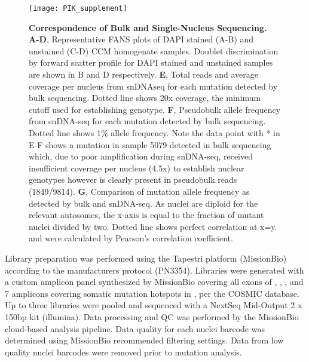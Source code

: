 \begin{figure}[tbp!]
\begin{center}
\texttt{[image: PIK\_supplement]}
\end{center}
\caption[Correspondence of Bulk and Single-Nucleus Sequencing.] {\textbf{Correspondence of Bulk and Single-Nucleus Sequencing.} \\ \textbf{A-D}, Representative FANS plots of DAPI stained (A-B) and unstained (C-D) CCM homogenate samples. Doublet discrimination by forward scatter profile for DAPI stained and unstained samples are shown in B and D respectively. \textbf{E}, Total reads and average coverage per nucleus from snDNAseq for each mutation detected by bulk sequencing. Dotted line shows 20x coverage, the minimum cutoff used for establishing genotype.  \textbf{F}, Pseudobulk allele frequency from snDNA-seq for each mutation detected by bulk sequencing. Dotted line shows 1\% allele frequency. Note the data point with * in E-F shows a mutation in sample 5079 detected in bulk sequencing which, due to poor amplification during snDNA-seq, received insufficient coverage per nucleus (4.5x) to establish nuclear genotypes however is clearly present in pseudobulk reads (1849/9814). \textbf{G}, Comparison of mutation allele frequency as detected by bulk and snDNA-seq. As nuclei are diploid for the relevant autosomes, the x-axis is equal to the fraction of mutant nuclei divided by two. Dotted line shows perfect correlation at x=y.  and  were calculated by Pearson’s correlation coefficient. }

\label{PIK_supplement}
\end{figure}

Library preparation was performed using the Tapestri platform (MissionBio) according to the manufacturers protocol (PN3354). Libraries were generated with a custom amplicon panel synthesized by MissionBio covering all exons of , , , and 7 amplicons covering somatic mutation hotspots in , per the COSMIC database. Up to three libraries were pooled and sequenced with a NextSeq Mid-Output 2 x 150bp kit (illumina). Data processing and QC was performed by the MissionBio cloud-based analysis pipeline. Data quality for each nuclei barcode was determined using MissionBio recommended filtering settings. Data from low quality nuclei barcodes were removed prior to mutation analysis. 
	
